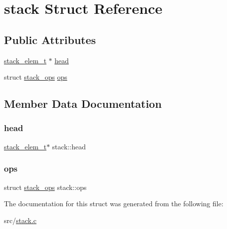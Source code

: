 \hypertarget{structstack}{}\section{stack Struct Reference}
\label{structstack}
\subsection*{Public Attributes}
\begin{DoxyCompactItemize}
\item 
\mbox{\hyperlink{stack_8c_ac5cddd37a51910f4e5c2ca6cf371b961}{stack\+\_\+elem\+\_\+t}} $\ast$ \mbox{\hyperlink{structstack_a8eb3ef6cb7f4938ed141fe41a3d3c8a6}{head}}
\item 
struct \mbox{\hyperlink{structstack__ops}{stack\+\_\+ops}} \mbox{\hyperlink{structstack_aafda422820e4433e1b36f211b0710601}{ops}}
\end{DoxyCompactItemize}


\subsection{Member Data Documentation}
\mbox{\label{structstack_a8eb3ef6cb7f4938ed141fe41a3d3c8a6}} 
\subsubsection{\texorpdfstring{head}{head}}
{\footnotesize\ttfamily \mbox{\hyperlink{stack_8c_ac5cddd37a51910f4e5c2ca6cf371b961}{stack\+\_\+elem\+\_\+t}}$\ast$ stack\+::head}

\mbox{\label{structstack_aafda422820e4433e1b36f211b0710601}} 
\subsubsection{\texorpdfstring{ops}{ops}}
{\footnotesize\ttfamily struct \mbox{\hyperlink{structstack__ops}{stack\+\_\+ops}} stack\+::ops}



The documentation for this struct was generated from the following file\+:\begin{DoxyCompactItemize}
\item 
src/\mbox{\hyperlink{stack_8c}{stack.\+c}}\end{DoxyCompactItemize}
